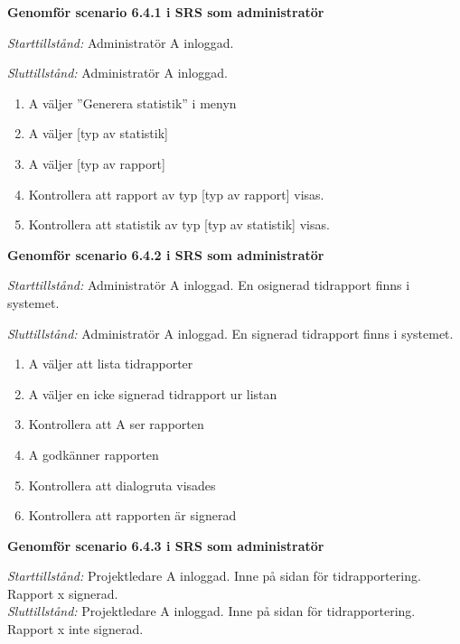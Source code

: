 \documentclass[a4paper]{article}
\begin{document}
\begin{ST}

\item
\textbf{Genomför scenario 6.4.1 i SRS som administratör}

\emph{Starttillstånd:} Administratör A inloggad.

\emph{Sluttillstånd:} Administratör A inloggad.

\begin{enumerate}
\item
A väljer ''Generera statistik'' i menyn
\item
A väljer [typ av statistik]
\item 
A väljer [typ av rapport]
\item
Kontrollera att rapport av typ [typ av rapport] visas.
\item
Kontrollera att statistik av typ [typ av statistik] visas.
\end{enumerate}

\item
\textbf{Genomför scenario 6.4.2 i SRS som administratör}

\emph{Starttillstånd:} Administratör A inloggad. En osignerad tidrapport finns i systemet.

\emph{Sluttillstånd:} Administratör A inloggad. En signerad tidrapport finns i systemet.

\begin{enumerate}

\item
A väljer att lista tidrapporter
\item
A väljer en icke signerad tidrapport ur listan
\item
Kontrollera att A ser rapporten
\item
A godkänner rapporten
\item
Kontrollera att dialogruta visades
\item
Kontrollera att rapporten är signerad

\end{enumerate}

\item
\textbf{Genomför scenario 6.4.3 i SRS som administratör}

\emph{Starttillstånd:} Projektledare A inloggad. Inne på sidan för tidrapportering. Rapport x signerad.\\
\emph{Sluttillstånd:} Projektledare A inloggad. Inne på sidan för tidrapportering. Rapport x inte signerad.\\



\end{ST}
\end{document}
